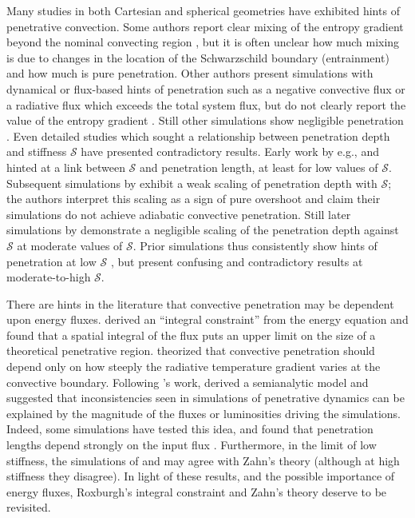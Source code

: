 \documentclass[twocolumn]{aastex631}
\newcommand{\mS}{\ensuremath{\mathcal{S}}}
\begin{document}
Many studies in both Cartesian and spherical geometries have exhibited hints of penetrative convection.
Some authors report clear mixing of the entropy gradient beyond the nominal convecting region \citep{hurlburt_etal_1994, saikia_etal_2000, brummell_etal_2002, rogers_glatzmaier_2005, rogers_etal_2006, kitiashvili_etal_2016}, but it is often unclear how much mixing is due to changes in the location of the Schwarzschild boundary (entrainment) and how much is pure penetration.
Other authors present simulations with dynamical or flux-based hints of penetration such as a negative convective flux or a radiative flux which exceeds the total system flux, but do not clearly report the value of the entropy gradient \citep{hurlburt_etal_1986, singh_etal_1995, browning_etal_2004, brun_etal_2017, pratt_etal_2017}.
Still other simulations show negligible penetration \citep[e.g.,][]{higl_etal_2021}.
Even detailed studies which sought a relationship between penetration depth and stiffness $\mS$ have presented contradictory results.
Early work by e.g., \citet{hurlburt_etal_1994} and \citet{singh_etal_1995} hinted at a link between $\mS$ and penetration length, at least for low values of $\mS$.
Subsequent simulations by \citet{brummell_etal_2002} exhibit a weak scaling of penetration depth with $\mS$; the authors interpret this scaling as a sign of pure overshoot and claim their simulations do not achieve adiabatic convective penetration.
Still later simulations by \citet{rogers_glatzmaier_2005} demonstrate a negligible scaling of the penetration depth against $\mS$ at moderate values of $\mS$.
Prior simulations thus consistently show hints of penetration at low $\mS$ \citep[where results may not be relevant for stars,][]{couston_etal_2017}, but present confusing and contradictory results at moderate-to-high $\mS$.

There are hints in the literature that convective penetration may be dependent upon energy fluxes.
\citet{roxburgh1978, roxburgh1989, roxburgh1992, roxburgh1998} derived an ``integral constraint'' from the energy equation and found that a spatial integral of the flux puts an upper limit on the size of a theoretical penetrative region.
\citet{zahn1991} theorized that convective penetration should depend only on how steeply the radiative temperature gradient varies at the convective boundary.
Following \citet{zahn1991}'s work, \citet{rempel2004} derived a semianalytic model and suggested that inconsistencies seen in simulations of penetrative dynamics can be explained by the magnitude of the fluxes or luminosities driving the simulations.
Indeed, some simulations have tested this idea, and found that penetration lengths depend strongly on the input flux \citep{singh_etal_1998, kapyla_etal_2007, tian_etal_2009, hotta2017, kapyla2019}.
Furthermore, in the limit of low stiffness, the simulations of \citet{hurlburt_etal_1994} and \citet{rogers_glatzmaier_2005} may agree with Zahn's theory (although at high stiffness they disagree).
In light of these results, and the possible importance of energy fluxes, Roxburgh's integral constraint and Zahn's theory deserve to be revisited.
\end{document}
